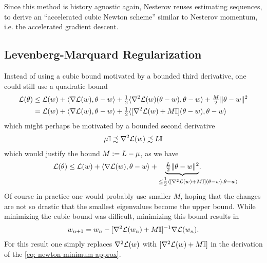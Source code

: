 Since this method is history agnostic again, Nesterov reuses estimating
sequences, to derive an ``accelerated cubic Newton scheme'' \parencite[Section
4.2]{nesterovLecturesConvexOptimization2018} similar to Nesterov momentum, i.e.
the accelerated gradient descent.

\subsection{Levenberg-Marquard Regularization}

Instead of using a cubic bound motivated by a bounded third derivative, one
could still use a quadratic bound
\begin{align*}
	\mathcal{L}(\theta)
	&\le \mathcal{L}(w) + \langle \nabla\mathcal{L}(w), \theta-w \rangle
	+ \tfrac12\langle \nabla^2\mathcal{L}(w)(\theta-w), \theta-w \rangle
	+ \tfrac{M}2\|\theta-w\|^2\\
	&= \mathcal{L}(w) + \langle \nabla\mathcal{L}(w), \theta-w \rangle
	+ \tfrac12\langle [\nabla^2\mathcal{L}(w)+M\mathbb{I}](\theta-w), \theta-w \rangle
\end{align*}
which might perhaps be motivated by a bounded second derivative
\begin{align*}
	\mu\mathbb{I} \precsim \nabla^2\mathcal{L}(w) \precsim L\mathbb{I}
\end{align*}
which would justify the bound \(M:=L-\mu\), as we have
\begin{align*}
	\Loss(\theta)
	&\le \Loss(\weights) + \langle \nabla\Loss(\weights), \theta-\weights \rangle
	+ \underbrace{\tfrac{\ubound}2\|\theta-\weights\|^2\mathrlap{.}}_{
		\le \tfrac12\langle
			[\nabla^2\Loss(\weights)+M\identity]
		\mathrlap{
			(\theta-\weights),
				\theta-\weights
			\rangle
		}
	}
\end{align*}
Of course in practice one would probably use smaller \(M\), hoping that
the changes are not so drastic that the smallest eigenvalues become the
upper bound. While minimizing the cubic bound was difficult, minimizing this
bound results in
\begin{align}\label{eq: levenberg-marquard regularization}
	w_{n+1}
	= w_n - [\nabla^2\mathcal{L}(w_n)+M\mathbb{I}]^{-1}\nabla\mathcal{L}(w_n).
\end{align}
For this result one simply replaces \(\nabla^2\mathcal{L}(w)\) with
\([\nabla^2\mathcal{L}(w)+M\mathbb{I}]\) in the derivation of the \ref{eq:
newton minimum approx}.

